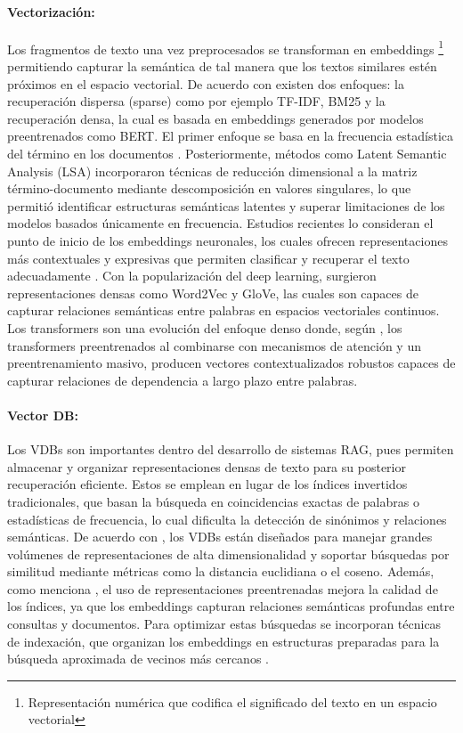 \paragraph{Vectorización:} Los fragmentos de texto una vez preprocesados se transforman en embeddings \footnote{Representación numérica que codifica el significado del texto en un espacio vectorial} permitiendo capturar la semántica de tal manera que 
los textos similares estén próximos en el espacio vectorial. De acuerdo con \textcite{hu2024ragrau} existen dos enfoques: la recuperación dispersa (sparse) como por ejemplo 
TF-IDF, BM25 y la recuperación densa, la cual es basada en embeddings generados por modelos preentrenados como BERT. El primer enfoque se basa en la frecuencia estadística del término en los documentos \parencite{fan2021pretraining}.
Posteriormente, métodos como Latent Semantic Analysis (LSA) incorporaron técnicas de reducción dimensional a la matriz término-documento mediante descomposición en valores singulares, lo que permitió identificar estructuras semánticas latentes y superar 
limitaciones de los modelos basados únicamente en frecuencia. Estudios recientes lo consideran el punto de inicio de los embeddings neuronales, los cuales ofrecen representaciones más contextuales y expresivas que permiten clasificar y recuperar el texto adecuadamente
\parencite{fan2021pretraining,minaee2021}. Con la popularización del deep learning, surgieron representaciones densas como Word2Vec y GloVe, las cuales son capaces de capturar relaciones semánticas entre palabras en espacios vectoriales continuos. Los transformers son una 
evolución del enfoque denso donde, según \textcite{casola2022pretrained}, los transformers preentrenados al combinarse con mecanismos de atención y un preentrenamiento masivo, producen vectores contextualizados robustos capaces de capturar relaciones de dependencia a largo
plazo entre palabras.

\paragraph{Vector DB:}
Los VDBs son importantes dentro del desarrollo de sistemas RAG, pues permiten almacenar y organizar representaciones densas de texto para su posterior
recuperación eficiente. Estos se emplean en lugar de los índices invertidos tradicionales, que basan la búsqueda en coincidencias exactas de palabras o estadísticas 
de frecuencia, lo cual dificulta la detección de sinónimos y relaciones semánticas. De acuerdo con \textcite{jing2024vecdb}, los VDBs están diseñados para manejar 
grandes volúmenes de representaciones de alta dimensionalidad y soportar búsquedas por similitud mediante métricas como la distancia euclidiana o el coseno. Además, 
como menciona \textcite{fan2021pretraining}, el uso de representaciones preentrenadas mejora la calidad de los índices, ya que los embeddings capturan relaciones 
semánticas profundas entre consultas y documentos. Para optimizar estas búsquedas se incorporan técnicas de indexación, que organizan los embeddings en estructuras preparadas para la búsqueda aproximada de vecinos más cercanos \parencite{ma2025vector}.  

